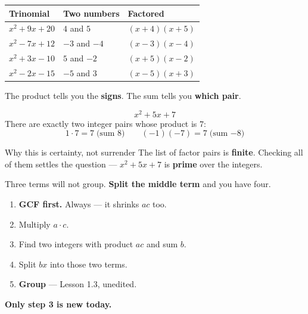 \documentclass[aspectratio=169, 11pt]{beamer}
\begin{document}
\begin{frame}[t, plain]
  \vspace{0.2cm}
  \renewcommand{\arraystretch}{1.5}
  \begin{tabularx}{\textwidth}{@{}p{3.2cm} p{4.0cm} X@{}}
    \textbf{Trinomial} & \textbf{Two numbers} & \textbf{Factored} \\
    \hline
    $x^2+9x+20$  & $4$ and $5$    & $(x+4)(x+5)$ \\
    $x^2-7x+12$  & $-3$ and $-4$  & $(x-3)(x-4)$ \\
    $x^2+3x-10$  & $5$ and $-2$   & $(x+5)(x-2)$ \\
    $x^2-2x-15$  & $-5$ and $3$   & $(x-5)(x+3)$ \\
  \end{tabularx}
  \vspace{0.3cm}

  The product tells you the \textbf{signs}. The sum tells you \textbf{which pair}.
\end{frame}

\begin{frame}[t, plain]
  \[ x^2+5x+7 \]
  There are exactly two integer pairs whose product is $7$:
  \[ 1 \cdot 7 = 7 \;\text{(sum } 8)  \qquad (-1)(-7) = 7 \;\text{(sum } {-8}) \]
  \begin{block}{Why this is certainty, not surrender}
    The list of factor pairs is \textbf{finite}. Checking all of them settles the question ---
    $x^2+5x+7$ is \textbf{prime} over the integers.
  \end{block}
\end{frame}

\begin{frame}[t, plain]
  Three terms will not group. \textbf{Split the middle term} and you have four.
  \begin{enumerate}
    \setlength{\itemsep}{0.15cm}
    \item \textbf{GCF first.} Always --- it shrinks $ac$ too.
    \item Multiply $a \cdot c$.
    \item Find two integers with product $ac$ and sum $b$.
    \item Split $bx$ into those two terms.
    \item \textbf{Group} --- Lesson 1.3, unedited.
  \end{enumerate}
  \vspace{0.2cm}
  {\color{goldacc}\bfseries Only step 3 is new today.}
\end{frame}
\end{document}
